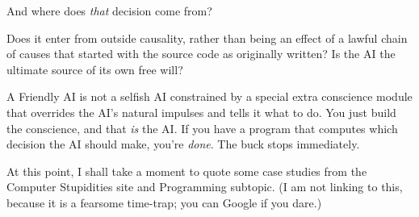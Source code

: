 {
 And where does \textit{that} decision come from?}

{
 Does it enter from outside causality, rather than being an effect
of a lawful chain of causes that started with the source code as
originally written? Is the AI the ultimate source of its own free
will?}

{
 A Friendly AI is not a selfish AI constrained by a special extra
conscience module that overrides the AI's natural
impulses and tells it what to do. You just build the conscience, and
that \textit{is} the AI. If you have a program that computes which
decision the AI should make, you're \textit{done}. The
buck stops immediately.}

{
 At this point, I shall take a moment to quote some case studies
from the Computer Stupidities site and Programming subtopic. (I am not
linking to this, because it is a fearsome time-trap; you can Google if
you dare.)}

